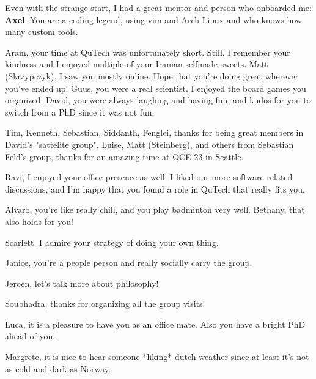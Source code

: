 
Even with the strange start, I had a great mentor and person who onboarded me: \textbf{Axel}.
You are a coding legend, using vim and Arch Linux and who knows how many custom tools.

Aram, your time at QuTech was unfortunately short. Still, I remember your kindness and I enjoyed multiple of your Iranian selfmade sweets.
Matt (Skrzypczyk), I saw you mostly online. Hope that you're doing great wherever you've ended up!
Guus, you were a real scientist. I enjoyed the board games you organized.
David, you were always laughing and having fun, and kudos for you to switch from a PhD since it was not fun.

Tim, Kenneth, Sebastian, Siddanth, Fenglei, thanks for being great members in David's "sattelite group".
Luise, Matt (Steinberg), and others from Sebastian Feld's group, thanks for an amazing time at QCE 23 in Seattle.


Ravi, I enjoyed your office presence as well. I liked our more software related discussions, and I'm happy that you found a role in QuTech that really fits you.




Alvaro, you're like really chill, and you play badminton very well. 
Bethany, that also holds for you!

Scarlett, I admire your strategy of doing your own thing.

Janice, you're a people person and really socially carry the group.

Jeroen, let's talk more about philosophy!

Soubhadra, thanks for organizing all the group visits!

Luca, it is a pleasure to have you as an office mate. Also you have a bright PhD ahead of you.

Margrete, it is nice to hear someone *liking* dutch weather since at least it's not as cold and dark as Norway.

